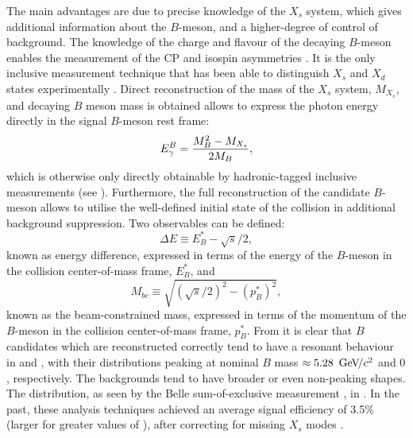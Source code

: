 The main advantages are due to precise knowledge of the $X_s$ system, which gives additional information about the $B$-meson, and a higher-degree of control of background.
The knowledge of the charge and flavour of the decaying $B$-meson enables the measurement of the CP and isospin asymmetries \cite{BaBar:2014czi}.
It is the only inclusive measurement technique that has been able to distinguish $X_s$ and $X_d$ states experimentally \cite{BaBar:2010vgu}.
Direct reconstruction of the mass of the $X_s$ system, $M_{X_s}$, and decaying $B$ meson mass is obtained allows to express the photon energy directly in the signal $B$-meson rest frame:
\begin{equation}\label{eq:mx_egamma_relation}
    {\ensuremath{E^B_{\gamma}}} = \frac{M_B^2 - M_{X_s}}{2M_B},
\end{equation}
which is otherwise only directly obtainable by hadronic-tagged inclusive measurements (see ).
Furthermore, the full reconstruction of the candidate $B$-meson allows to utilise the well-defined initial state of the \epem collision in additional background suppression.
Two observables can be defined:
\begin{equation}\label{eq:deltae_inclusive}
    \Delta E \equiv E^*_B - \sqrt{s}/2,
\end{equation}
known as energy difference, expressed in terms of the energy of the $B$-meson in the collision center-of-mass frame, $E^*_B$, and
\begin{equation}\label{eq:mbc_exclusive}
    M_{bc} \equiv \sqrt{(\sqrt{s}/2)^2 - (p^*_B)^2},
\end{equation}
known as the beam-constrained mass, expressed in terms of the momentum of the $B$-meson in the collision center-of-mass frame, $p^*_B$.
From  it is clear that $B$ candidates which are reconstructed correctly tend to have a resonant behaviour in \Mbc and \DeltaE, with their distributions peaking at nominal $B$ mass $\approx5.28~{\mathrm{\,Ge\kern -0.1em V\!/}c^2}$ and $0$, respectively.
The backgrounds tend to have broader or even non-peaking shapes. 
The \Mbc distribution, as seen by the Belle sum-of-exclusive measurement \cite{Belle:2014nmp}, in .
In the past, these analysis techniques achieved an average signal efficiency of 3.5\%~ (larger for greater values of \EB), after correcting for missing $X_s$ modes \cite{Belle:2014nmp}.

